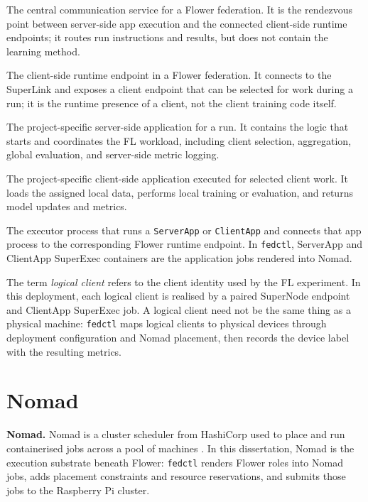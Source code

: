 \begin{description}[leftmargin=2.8cm, style=nextline]
  \item[SuperLink] The central communication service for a Flower federation. It is the rendezvous point between server-side app execution and the connected client-side runtime endpoints; it routes run instructions and results, but does not contain the learning method.
  \item[SuperNode] The client-side runtime endpoint in a Flower federation. It connects to the SuperLink and exposes a client endpoint that can be selected for work during a run; it is the runtime presence of a client, not the client training code itself.
  \item[ServerApp] The project-specific server-side application for a run. It contains the logic that starts and coordinates the FL workload, including client selection, aggregation, global evaluation, and server-side metric logging.
  \item[ClientApp] The project-specific client-side application executed for selected client work. It loads the assigned local data, performs local training or evaluation, and returns model updates and metrics.
  \item[SuperExec] The executor process that runs a \texttt{ServerApp} or \texttt{ClientApp} and connects that app process to the corresponding Flower runtime endpoint. In \texttt{fedctl}, ServerApp and ClientApp SuperExec containers are the application jobs rendered into Nomad.
\end{description}

The term \emph{logical client} refers to the client identity used by the FL experiment. In this deployment, each logical client is realised by a paired SuperNode endpoint and ClientApp SuperExec job. A logical client need not be the same thing as a physical machine: \texttt{fedctl} maps logical clients to physical devices through deployment configuration and Nomad placement, then records the device label with the resulting metrics.

\section{Nomad}
\label{def:nomad}

\begin{definition}
\textbf{Nomad.}
Nomad is a cluster scheduler from HashiCorp used to place and run containerised jobs across a pool of machines \parencite{nomad}. In this dissertation, Nomad is the execution substrate beneath Flower: \texttt{fedctl} renders Flower roles into Nomad jobs, adds placement constraints and resource reservations, and submits those jobs to the Raspberry Pi cluster.
\end{definition}

